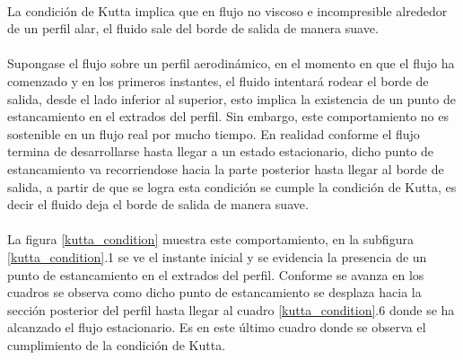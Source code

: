\documentclass[letterpaper, openright, 12pt]{book}
\begin{document}
    \paragraph*{}
        La condición de Kutta implica que en flujo no viscoso e incompresible
        alrededor de un perfil alar, el fluido sale del borde de salida de
        manera suave.

    \paragraph*{}
        Supongase el flujo sobre un perfil aerodinámico, en el momento en que
        el flujo ha comenzado y en los primeros instantes, el fluido intentará
        rodear el borde de salida, desde el lado inferior al superior, esto
        implica la existencia de un punto de estancamiento en el extrados del
        perfil. Sin embargo, este comportamiento no es sostenible en un flujo
        real por mucho tiempo. En realidad conforme el flujo termina de
        desarrollarse hasta llegar a un estado estacionario, dicho punto de
        estancamiento va recorriendose hacia la parte posterior hasta llegar al
        borde de salida, a partir de que se logra esta condición se cumple la
        condición de Kutta, es decir el fluido deja el borde de salida de
        manera suave.

    \paragraph*{}
        La figura \ref{kutta_condition} muestra este comportamiento, en la
        subfigura \ref{kutta_condition}.1 se ve el instante inicial y se
        evidencia la presencia de un punto de estancamiento en el extrados del
        perfil. Conforme se avanza en los cuadros se observa como dicho punto de
        estancamiento se desplaza hacia la sección posterior del perfil hasta
        llegar al cuadro \ref{kutta_condition}.6 donde se ha alcanzado el flujo
        estacionario. Es en este último cuadro donde se observa el cumplimiento
        de la condición de Kutta.
\end{document}
